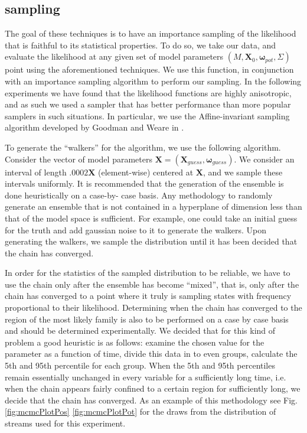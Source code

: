 \documentclass[12pt,preprint]{aastex}
\theoremstyle{plain}
\theoremstyle{definition}
\newcommand{\mtensor}[1]{\boldsymbol{#1}}
\newcommand{\mvector}[1]{\mtensor{#1}}
\newcommand{\vX}{\mvector{X}}
\newcommand{\vomega}{\mvector{\omega}}
\begin{document}
\subsection{sampling}
The goal of these techniques is to have an importance sampling of the likelihood that is faithful to its statistical properties. To do so, we take our data, and evaluate the likelihood at any given set of model parameters $(M, \vX_0, \vomega_{pot}, \Sigma)$ point using the aforementioned techniques. We use this function, in conjunction with an importance sampling algorithm to perform our sampling. In the following experiments we have found that the likelihood functions are highly anisotropic, and as such we used a sampler that has better performance than more popular samplers in such situations. In particular, we use the Affine-invariant sampling algorithm developed by Goodman and Weare in \cite{GW}.

To generate the ``walkers'' for the algorithm, we use the following algorithm. Consider the vector of model parameters $\vX =(\vX_{guess},\vomega_{guess})$. We consider an interval of length $.0002\vX$ (element-wise) centered at $\vX$, and we sample these intervals uniformly. It is recommended that the generation of the ensemble is done heuristically on a case-by- case
basis. Any methodology to randomly generate an ensemble that is not contained in a
hyperplane of dimension less than that of the model space is sufficient.
For example, one could take an initial guess for the truth and add
gaussian noise to it to generate the walkers. Upon generating the
walkers, we sample the distribution until it has been decided that the
chain has converged.

In order for the statistics of the sampled distribution to be reliable, we have to use the chain only after the ensemble has become ``mixed'', that is, only after the chain has converged to a point where it truly is sampling states with frequency proportional to their likelihood. Determining when the chain has converged to the region of the most likely family is also to be performed on a case by case basis and
should be determined experimentally. We decided that for this kind of
problem a good heuristic is as follows: examine the chosen value for
the parameter as a function of time, divide this data in to even
groups, calculate the 5th and 95th percentile for each group. When the
5th and 95th percentiles remain essentially unchanged in every
variable for a sufficiently long time, i.e. when the chain appears
fairly confined to a certain region for sufficiently long, we decide
that the chain has converged. As an example of this methodology see Fig.
\ref{fig:mcmcPlotPos} \ref{fig:mcmcPlotPot} for the draws from the distribution
of streams used for this experiment.
\end{document}
